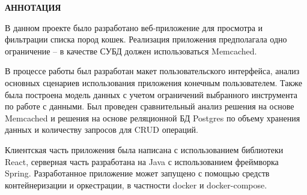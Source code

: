 \pagebreak
\begin{center}
    \textbf{АННОТАЦИЯ}
\end{center}

В данном проекте было разработано веб-приложение для просмотра и фильтрации списка
пород кошек.
Реализация приложения предполагала одно ограничение -- в качестве СУБД должен
использоваться Memcached.

В процессе работы был разработан макет пользовательского интерфейса,
анализ основных сценариев использования приложения конечным пользователем.
Также была построена модель данных с учетом ограничений выбранного инструмента
по работе с данными.
Был проведен сравнительный анализ решения на основе Memcached и решения на основе
реляционной БД Postgres по объему хранения данных и количеству запросов для CRUD операций.

Клиентская часть приложения была написана с использованием библиотеки React,
серверная часть разработана на Java с использованием фреймворка Spring.
Разработанное приложение может запущено с помощью средств контейнеризации и оркестрации,
в частности docker и docker-compose.